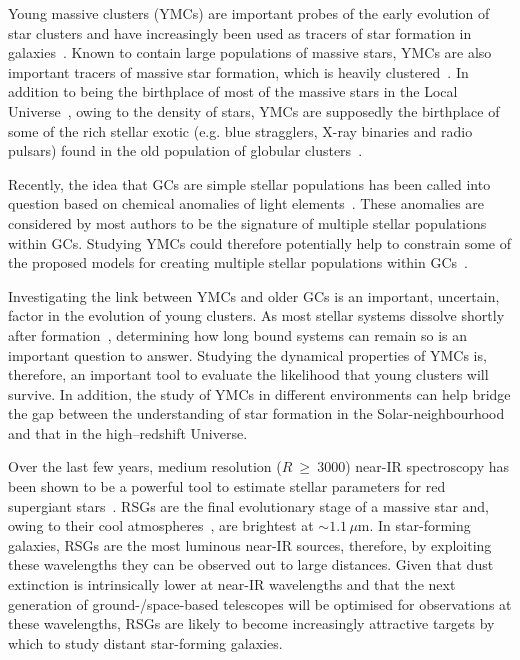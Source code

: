 \documentclass[useAMS,usenatbib]{mn2e}
\begin{document}
Young massive clusters (YMCs\footnotemark) are important probes of the early evolution of star clusters and have increasingly been used as tracers of star formation in galaxies~\citep[e.g.][]{1995AJ....109..960W,1997AJ....114.2381M,1999AJ....118..752Z}.
Known to contain large populations of massive stars, YMCs are also important tracers of massive star formation, which is heavily clustered~\citep{2003ARA&A..41...57L,2005A&A...437..247D,2007MNRAS.380.1271P}.
In addition to being the birthplace of most of the massive stars in the Local Universe~\citep[$>200\,$M$_{\odot}$ stars in R136;][]{2010MNRAS.408..731C}, owing to the density of stars, YMCs are supposedly the birthplace of some of the rich stellar exotic
(e.g. blue stragglers, X-ray binaries and radio pulsars) found in the old population of globular clusters~\citep[GCs;]{2010ARA&A..48..431P}.


Recently, the idea that GCs are simple stellar populations has been called into question based on chemical anomalies of light elements~\citep[C, N, O, Na and Al; e.g.][]{2012A&ARv..20...50G}.
These anomalies are considered by most authors to be the signature of multiple stellar populations within GCs.
Studying YMCs could therefore potentially help to constrain some of the proposed models for creating multiple stellar populations within GCs~\citep[e.g.][]{2014MNRAS.441.2754C}.

Investigating the link between YMCs and older GCs is an important, uncertain, factor in the evolution of young clusters.
As most stellar systems dissolve shortly after formation~\citep{2003ARA&A..41...57L}, determining how long bound systems can remain so is an important question to answer.
Studying the dynamical properties of YMCs is, therefore, an important tool to evaluate the likelihood that young clusters will survive.
In addition, the study of YMCs in different environments can help bridge the gap between the understanding of star formation in the Solar-neighbourhood and that in the high--redshift Universe.


Over the last few years, medium resolution ($R~\geq~3000$) near-IR spectroscopy has been shown to be a powerful tool to estimate stellar parameters for red supergiant stars~\citep[RSGs;][]{2010MNRAS.407.1203D}.
RSGs are the final evolutionary stage of a massive star and, owing to their cool atmospheres~\citep[T$_{\rm eff}\sim$~4000\,K;][]{2013ApJ...767....3D}, are brightest at $\sim1.1\,\mu$m.
In star-forming galaxies, RSGs are the most luminous near-IR sources, therefore, by exploiting these wavelengths they can be observed out to large distances.
Given that dust extinction is intrinsically lower at near-IR wavelengths and that the next generation of ground-/space-based telescopes will be optimised for observations at these wavelengths, RSGs are likely to become increasingly attractive targets by which to study distant star-forming galaxies.
\end{document}
